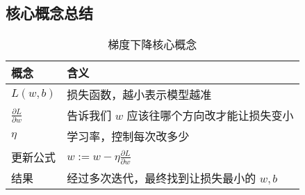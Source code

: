 \documentclass[UTF8]{ctexart}
\begin{document}
	\subsection{核心概念总结}
	\begin{table}[H]
		\centering
		\begin{tabular}{lp{8cm}}
			\toprule
			概念 & 含义 \\
			\midrule
			$L(w, b)$ & 损失函数，越小表示模型越准 \\
			$\frac{\partial L}{\partial w}$ & 告诉我们 $w$ 应该往哪个方向改才能让损失变小 \\
			$\eta$ & 学习率，控制每次改多少 \\
			更新公式 & $w := w - \eta \frac{\partial L}{\partial w}$ \\
			结果 & 经过多次迭代，最终找到让损失最小的 $w, b$ \\
			\bottomrule
		\end{tabular}
		\caption{梯度下降核心概念}
	\end{table}
	
\end{document}
